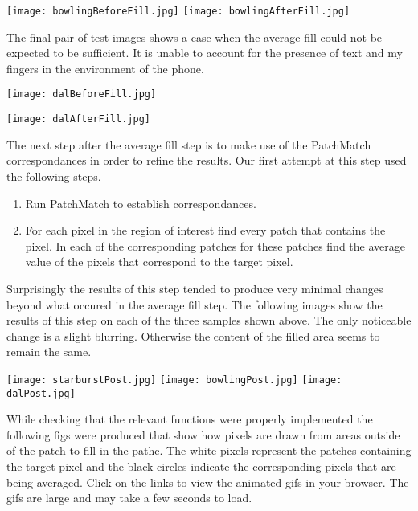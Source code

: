 \documentclass[12pt]{article}
\begin{document}
\begin{center}
\texttt{[image: bowlingBeforeFill.jpg]}
\texttt{[image: bowlingAfterFill.jpg]}
\end{center}

The final pair of test images shows a case when the average fill could not be expected to be sufficient. It is unable to account for the presence of text and my fingers in the environment of the phone.

\begin{center}
\texttt{[image: dalBeforeFill.jpg]}

\texttt{[image: dalAfterFill.jpg]}
\end{center}

The next step after the average fill step is to make use of the PatchMatch correspondances in order to refine the results. Our first attempt at this step used the following steps.
\begin{enumerate}
    \item Run PatchMatch to establish correspondances.
    \item For each pixel in the region of interest find every patch that contains the pixel. In each of the corresponding patches for these patches find the average value of the pixels that correspond to the target pixel.
\end{enumerate}

Surprisingly the results of this step tended to produce very minimal changes beyond what occured in the average fill step. The following images show the results of this step on each of the three samples shown above. The only noticeable change is a slight blurring. Otherwise the content of the filled area seems to remain the same.
\begin{center}
    \texttt{[image: starburstPost.jpg]}
    \texttt{[image: bowlingPost.jpg]}
    \texttt{[image: dalPost.jpg]}
\end{center}

While checking that the relevant functions were properly implemented the following figs were produced that show how pixels are drawn from areas outside of the patch to fill in the pathc. The white pixels represent the patches containing the target pixel and the black circles indicate the corresponding pixels that are being averaged. Click on the links to view the animated gifs in your browser. The gifs are large and may take a few seconds to load.
\end{document}
